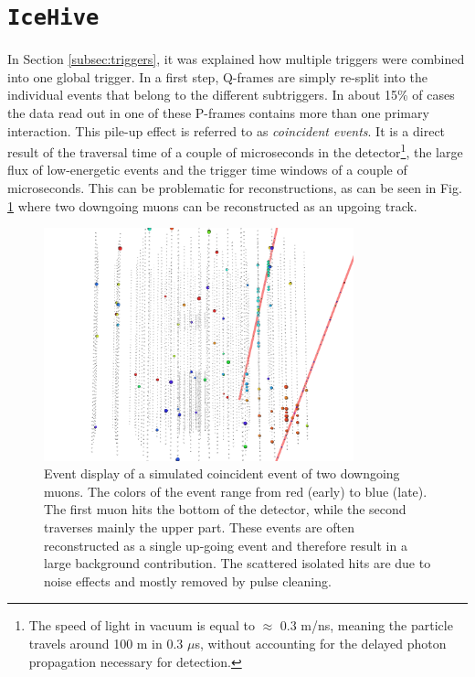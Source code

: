 \section{\texttt{IceHive}}
\label{sec:icehive}
In Section \ref{subsec:triggers}, it was explained how multiple triggers were combined into one global trigger. In a first step, Q-frames are simply re-split into the individual events that belong to the different subtriggers. In about 15\% of cases the data read out in one of these P-frames contains more than one primary interaction. This pile-up effect is referred to as \textit{coincident events}. It is a direct result of the traversal time of a couple of microseconds in the detector\footnote{The speed of light in vacuum is equal to $\approx$ 0.3 m/ns, meaning the particle travels around 100 m in 0.3 $\mu$s, without accounting for the delayed photon propagation necessary for detection.}, the large flux of low-energetic events and the trigger time windows of a couple of microseconds. This can be problematic for reconstructions, as can be seen in Fig. \ref{fig:coincidentevent} where two downgoing muons can be reconstructed as an upgoing track.\\

\begin{figure}[t]
\centering
\includegraphics[width=0.8\textwidth]{chapter7/img/coincidenteventsCORS.png}
\caption{Event display of a simulated coincident event of two downgoing muons. The colors of the event range from red (early) to blue (late). The first muon hits the bottom of the detector, while the second traverses mainly the upper part. These events are often reconstructed as a single up-going event and therefore result in a large background contribution. The scattered isolated hits are due to noise effects and mostly removed by pulse cleaning.}
\label{fig:coincidentevent}
\end{figure}


